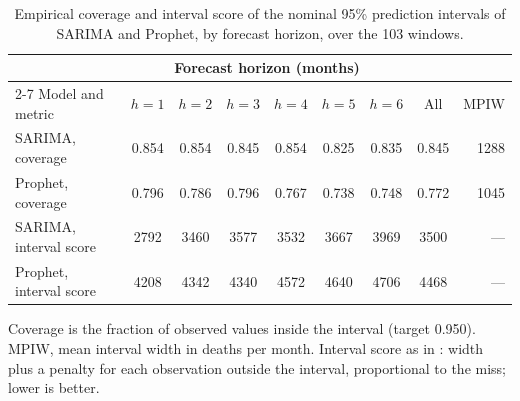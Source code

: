 \begin{table}[htbp]
\centering
\small
\setlength{\tabcolsep}{5pt}
\caption{Empirical coverage and interval score of the nominal 95\% prediction intervals of SARIMA and Prophet, by forecast horizon, over the 103 windows.}
\label{tab:calibracao}
\begin{tabular}{lcccccccr}
\toprule
& \multicolumn{6}{c}{Forecast horizon (months)} & & \\
\cmidrule(lr){2-7}
Model and metric & $h=1$ & $h=2$ & $h=3$ & $h=4$ & $h=5$ & $h=6$ & All & MPIW \\
\midrule
SARIMA, coverage & 0.854 & 0.854 & 0.845 & 0.854 & 0.825 & 0.835 & 0.845 & 1288 \\
Prophet, coverage & 0.796 & 0.786 & 0.796 & 0.767 & 0.738 & 0.748 & 0.772 & 1045 \\
\midrule
SARIMA, interval score & 2792 & 3460 & 3577 & 3532 & 3667 & 3969 & 3500 & --- \\
Prophet, interval score & 4208 & 4342 & 4340 & 4572 & 4640 & 4706 & 4468 & --- \\
\bottomrule
\end{tabular}

\vspace{0.5em}
\begin{minipage}{\textwidth}
\footnotesize
Coverage is the fraction of observed values inside the interval (target 0.950). MPIW, mean interval width in deaths per month. Interval score as in \citet{gneiting2007}: width plus a penalty for each observation outside the interval, proportional to the miss; lower is better.
\end{minipage}
\end{table}
